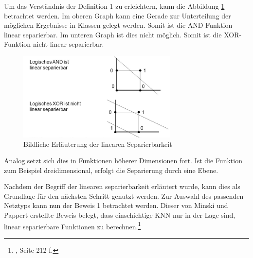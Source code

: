 Um das Verständnis der Definition 1 zu erleichtern, kann die Abbildung \ref{fig:Bildliche Erläuterung der linearen Separierbarkeit} betrachtet werden. Im oberen Graph kann eine Gerade zur Unterteilung der möglichen Ergebnisse in Klassen gelegt werden. Somit ist die AND-Funktion linear separierbar. Im unteren Graph ist dies nicht möglich. Somit ist die XOR-Funktion nicht linear separierbar.  

\begin{figure}[H]
\centering
		\includegraphics[width=0.71\textwidth]{Linear_Sep.PNG}
	\caption{Bildliche Erläuterung der linearen Separierbarkeit}
	\label{fig:Bildliche Erläuterung der linearen Separierbarkeit}
\end{figure}

Analog setzt sich dies in Funktionen höherer Dimensionen fort. Ist die Funktion zum Beispiel dreidimensional, erfolgt die Separierung durch eine Ebene.

Nachdem der Begriff der linearen separierbarkeit erläutert wurde, kann dies als Grundlage für den nächsten Schritt genutzt werden. Zur Auswahl des passenden Netztyps kann nun der Beweis 1 betrachtet werden. Dieser von Minski und Pappert erstellte Beweis  belegt, dass einschichtige KNN nur in der Lage sind, linear separierbare Funktionen zu berechnen.\footnote{\Vgl{}, Seite 212 f.}

\newpage

